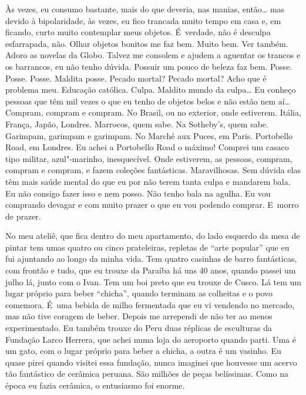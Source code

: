 Às vezes, eu consumo bastante, mais do que deveria, nas manias,
então… mas devido à bipolaridade, às vezes, eu fico trancada
muito tempo em casa e, em ficando, curto muito contemplar meus objetos.
É~verdade, não é desculpa esfarrapada, não. Olhar objetos bonitos me faz
bem. Muito bem. Ver  também. Adoro as novelas da Globo. Talvez me
consolem e ajudem a aguentar os trancos e os barrancos, eu não tenho
dúvida. Possuir um pouco de beleza faz bem. Posse. Posse. Posse. Maldita
posse. Pecado mortal? Pecado mortal? Acho que é problema meu. Educação
católica. Culpa. Maldito mundo da culpa… Eu conheço pessoas que
têm mil vezes o que eu tenho de objetos belos e não estão nem aí…
Compram, compram e compram. No Brasil, ou no exterior, onde estiverem.
Itália, França, Japão, Londres. Marrocos, quem sabe. Na Sotheby's, quem
sabe. Garimpam, garimpam e garimpam. No Marché aux Puces, em Paris.
Portobello Road, em Londres. Eu achei a Portobello Road o máximo!
Comprei um casaco tipo militar, azul"-marinho, inesquecível. Onde
estiverem, as pessoas, compram, compram e compram, e fazem coleções
fantásticas. Maravilhosas. Sem dúvida elas têm mais saúde mental do que
eu por não terem tanta culpa e mandarem bala. Eu não consigo fazer isso
e nem posso. Não tenho bala na agulha. Eu vou comprando devagar e com
muito prazer o que eu vou podendo comprar. E~morro de prazer.

No meu ateliê, que fica dentro do meu apartamento, do lado esquerdo da
mesa de pintar tem umas quatro ou cinco prateleiras, repletas de ``arte
popular'' que eu fui ajuntando ao longo da minha vida. Tem quatro
casinhas de barro fantásticas, com frontão e tudo, que eu trouxe da
Paraíba há uns 40 anos, quando passei um julho lá, junto com o Ivan. Tem
um boi preto que eu trouxe de Cusco. Lá tem um lugar próprio para beber
``chicha'', quando terminam as colheitas e o povo comemora. É~uma bebida
de milho fermentada que eu vi vendendo no mercado, mas não tive coragem
de beber. Depois me arrependi de não ter ao menos experimentado. Eu
também trouxe do Peru duas réplicas de esculturas da Fundação Larco
Herrera, que achei numa loja do aeroporto quando parti. Uma é um gato,
com o lugar próprio para beber a chicha, a outra é um vasinho. Eu quase
pirei quando visitei essa fundação, nunca imaginei que houvesse um
acervo tão fantástico de cerâmica peruana. São milhões de peças
belíssimas. Como na época eu fazia cerâmica, o entusiasmo foi enorme.

